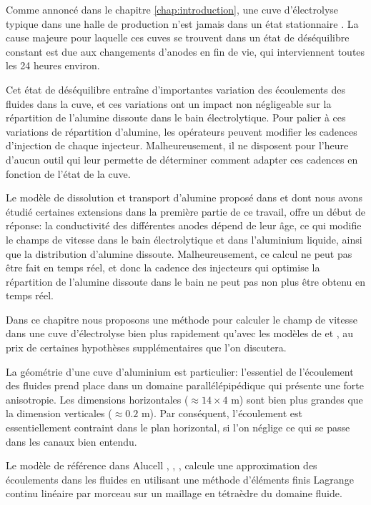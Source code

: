 Comme annoncé dans le chapitre \ref{chap:introduction}, une cuve
d'électrolyse typique dans une halle de production n'est jamais dans
un état stationnaire \cite{Steiner2009,Flotron2013}. La cause
majeure pour laquelle ces cuves se trouvent dans un état de
déséquilibre constant est due aux changements d'anodes en fin de vie,
qui interviennent toutes les 24 heures environ.

Cet état de déséquilibre entraîne d'importantes variation des
écoulements des fluides dans la cuve, et ces variations ont un impact
non négligeable sur la répartition de l'alumine dissoute dans le bain
électrolytique. Pour palier à ces variations de répartition d'alumine,
les opérateurs peuvent modifier les cadences d'injection de chaque
injecteur. Malheureusement, il ne disposent pour l'heure d'aucun outil
qui leur permette de déterminer comment adapter ces cadences en
fonction de l'état de la cuve.

Le modèle de dissolution et transport d'alumine proposé dans
\cite{Hofer2011} et dont nous avons étudié certaines extensions dans
la première partie de ce travail, offre un début de réponse: la
conductivité des différentes anodes dépend de leur âge, ce qui modifie
le champs de vitesse dans le bain électrolytique et dans l'aluminium
liquide, ainsi que la distribution d'alumine
dissoute. Malheureusement, ce calcul ne peut pas être fait en temps
réel, et donc la cadence des injecteurs qui optimise la répartition de
l'alumine dissoute dans le bain ne peut pas non plus être obtenu en
temps réel.

Dans ce chapitre nous proposons une méthode pour calculer le champ de
vitesse dans une cuve d'électrolyse bien plus rapidement qu'avec les
modèles de \cite{Steiner2009} et \cite{Hofer2011}, au prix de
certaines hypothèses supplémentaires que l'on discutera.

La géométrie d'une cuve d'aluminium est particulier: l'essentiel de
l'écoulement des fluides prend place dans un domaine
parallélépipédique qui présente une forte anisotropie. Les dimensions
horizontales ($\approx \num{14}\times\num{4}$ \si{\meter}) sont bien plus
grandes que la dimension verticales ($\approx \num{0.2}$ \si{\meter}). Par
conséquent, l'écoulement est essentiellement contraint dans le plan
horizontal, si l'on néglige ce qui se passe dans les canaux bien
entendu.

Le modèle de référence dans Alucell \cite{Steiner2009},
\cite{Flotron2013}, \cite{Hofer2011}, \cite{Rochat2016} calcule une
approximation des écoulements dans les fluides en utilisant une
méthode d'éléments finis Lagrange continu linéaire par morceau sur un
maillage en tétraèdre du domaine fluide.

